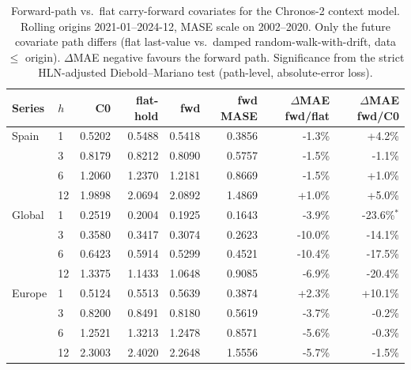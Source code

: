 \begin{table}[t]
\centering
\small
\begin{tabular}{llrrrr rr}
\toprule
Series & $h$ & C0 & flat-hold & fwd & fwd MASE & $\Delta$MAE fwd/flat & $\Delta$MAE fwd/C0 \\
\midrule
Spain & 1 & 0.5202 & 0.5488 & 0.5418 & 0.3856 & -1.3\% & +4.2\% \\
 & 3 & 0.8179 & 0.8212 & 0.8090 & 0.5757 & -1.5\% & -1.1\% \\
 & 6 & 1.2060 & 1.2370 & 1.2181 & 0.8669 & -1.5\% & +1.0\% \\
 & 12 & 1.9898 & 2.0694 & 2.0892 & 1.4869 & +1.0\% & +5.0\% \\
\midrule
Global & 1 & 0.2519 & 0.2004 & 0.1925 & 0.1643 & -3.9\% & -23.6\%$^{\ast}$ \\
 & 3 & 0.3580 & 0.3417 & 0.3074 & 0.2623 & -10.0\% & -14.1\% \\
 & 6 & 0.6423 & 0.5914 & 0.5299 & 0.4521 & -10.4\% & -17.5\% \\
 & 12 & 1.3375 & 1.1433 & 1.0648 & 0.9085 & -6.9\% & -20.4\% \\
\midrule
Europe & 1 & 0.5124 & 0.5513 & 0.5639 & 0.3874 & +2.3\% & +10.1\% \\
 & 3 & 0.8200 & 0.8491 & 0.8180 & 0.5619 & -3.7\% & -0.2\% \\
 & 6 & 1.2521 & 1.3213 & 1.2478 & 0.8571 & -5.6\% & -0.3\% \\
 & 12 & 2.3003 & 2.4020 & 2.2648 & 1.5556 & -5.7\% & -1.5\% \\
\bottomrule
\end{tabular}
\caption{Forward-path vs.\ flat carry-forward covariates for the Chronos-2 context model. Rolling origins 2021-01--2024-12, MASE scale on 2002--2020. Only the future covariate path differs (flat last-value vs.\ damped random-walk-with-drift, data $\le$ origin). $\Delta$MAE negative favours the forward path. Significance from the strict HLN-adjusted Diebold--Mariano test (path-level, absolute-error loss).}
\label{tab:forward_path}
\end{table}
